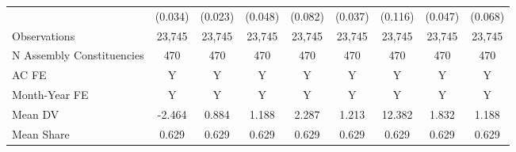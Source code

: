 {\begin{tabular}{l*{8}{c}}
            &     (0.034)         &     (0.023)         &     (0.048)         &     (0.082)         &     (0.037)         &     (0.116)         &     (0.047)         &     (0.068)         \\
Observations&      23,745         &      23,745         &      23,745         &      23,745         &      23,745         &      23,745         &      23,745         &      23,745         \\
N Assembly Constituencies&         470         &         470         &         470         &         470         &         470         &         470         &         470         &         470         \\
AC FE       &           Y         &           Y         &           Y         &           Y         &           Y         &           Y         &           Y         &           Y         \\
Month-Year FE&           Y         &           Y         &           Y         &           Y         &           Y         &           Y         &           Y         &           Y         \\
Mean DV     &      -2.464         &       0.884         &       1.188         &       2.287         &       1.213         &      12.382         &       1.832         &       1.188         \\
Mean Share  &       0.629         &       0.629         &       0.629         &       0.629         &       0.629         &       0.629         &       0.629         &       0.629         \\
\bottomrule
\end{tabular}
}
